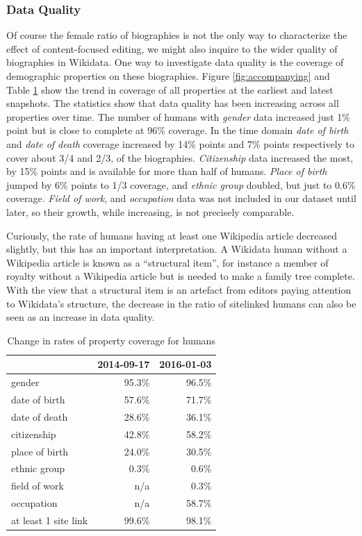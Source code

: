 \documentclass{sig-alternate-05-2015}
\begin{document}
\subsubsection{Data Quality}
Of course the female ratio of biographies is not the only way to characterize the effect of content-focused editing, we might also inquire to the wider quality of biographies in Wikidata. One way to investigate data quality is the coverage of demographic  properties on these biographies. Figure \ref{fig:accompanying} and Table \ref{table:accompanying} show the trend in coverage of all properties at the earliest and latest snapshots. The statistics show that data quality has been increasing across all properties over time. The number of humans with \textit{gender} data increased just 1\% point but is close to complete at 96\% coverage. In the time domain \textit{date of birth} and \textit{date of death} coverage increased by 14\% points and 7\% points respectively to cover about 3/4 and 2/3, of the biographies. \textit{Citizenship} data increased the most, by 15\% points and is available for more than half of humans. \textit{Place of birth} jumped by 6\% points to 1/3 coverage, and \textit{ethnic group} doubled, but just to 0.6\% coverage. \textit{Field of work}, and \textit{occupation} data was not included in our dataset until later, so their growth, while increasing, is not precisely comparable.


Curiously, the rate of humans having at least one Wikipedia article decreased slightly, but this has an important interpretation. A Wikidata human without a Wikipedia article is known as a ``structural item'', for instance a member of royalty without a Wikipedia article but is needed to make a family tree complete. With the view that a structural item is an artefact from editors paying attention to Wikidata's structure, the decrease in the ratio of sitelinked humans can also be seen as an increase in data quality. 

\begin{table}
\caption{Change in rates of property coverage for humans}
\begin{tabular}{lrr}
\toprule
{} &  2014-09-17 &  2016-01-03 \\
\midrule
gender               &       95.3\% &       96.5\% \\
date of birth        &       57.6\% &       71.7\% \\
date of death        &       28.6\% &       36.1\% \\
citizenship          &       42.8\% &       58.2\% \\
place of birth       &       24.0\% &       30.5\% \\
ethnic group         &        0.3\% &        0.6\% \\
field of work        &        n/a &        0.3\% \\
occupation           &        n/a &       58.7\% \\
at least 1 site link &       99.6\% &       98.1\% \\
\bottomrule
\end{tabular}
\label{table:accompanying}
\end{table}
\end{document}
